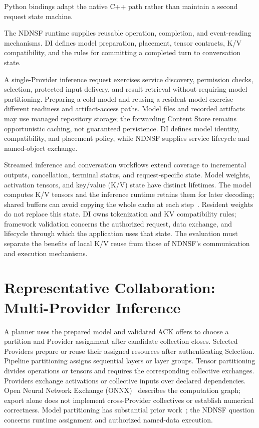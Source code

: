 Python bindings adapt the native C++ path rather than maintain a second request state machine.

The NDNSF runtime supplies reusable operation, completion, and event-reading mechanisms. DI defines model preparation, placement, tensor contracts, K/V compatibility, and the rules for committing a completed turn to conversation state.

A single-Provider inference request exercises service discovery, permission checks, selection, protected input delivery, and result retrieval without requiring model partitioning. Preparing a cold model and reusing a resident model exercise different readiness and artifact-access paths. Model files and recorded artifacts may use managed repository storage; the forwarding Content Store remains opportunistic caching, not guaranteed persistence. DI defines model identity, compatibility, and placement policy, while NDNSF supplies service lifecycle and named-object exchange.

Streamed inference and conversation workflows extend coverage to incremental outputs, cancellation, terminal status, and request-specific state. Model weights, activation tensors, and key/value (K/V) state have distinct lifetimes. The model computes K/V tensors and the inference runtime retains them for later decoding; shared buffers can avoid copying the whole cache at each step~\cite{ortkvcache}. Resident weights do not replace this state. DI owns tokenization and KV compatibility rules; framework validation concerns the authorized request, data exchange, and lifecycle through which the application uses that state. The evaluation must separate the benefits of local K/V reuse from those of NDNSF's communication and execution mechanisms.

\section{Representative Collaboration: Multi-Provider Inference}
A planner uses the prepared model and validated ACK offers to choose a partition and Provider assignment after candidate collection closes. Selected Providers prepare or reuse their assigned resources after authenticating Selection. Pipeline partitioning assigns sequential layers or layer groups. Tensor partitioning divides operations or tensors and requires the corresponding collective exchanges. Providers exchange activations or collective inputs over declared dependencies. Open Neural Network Exchange (ONNX)~\cite{onnx} describes the computation graph; export alone does not implement cross-Provider collectives or establish numerical correctness. Model partitioning has substantial prior work~\cite{neurosurgeon,ddnn}; the NDNSF question concerns runtime assignment and authorized named-data execution.

